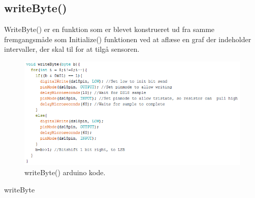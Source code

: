
\subsection{writeByte()}
WriteByte() er en funktion som er blevet konstrueret ud fra samme fremgangsmåde som Initialize() funktionen ved at aflæse en graf der indeholder intervaller, der skal til for at tilgå sensoren.

\begin{figure}[h!]
  \centering
  \includegraphics[width=1\textwidth]{figures/write_byte.png}
  \caption{writeByte() arduino kode.}
  \label{write_byte}
\end{figure}

writeByte 
